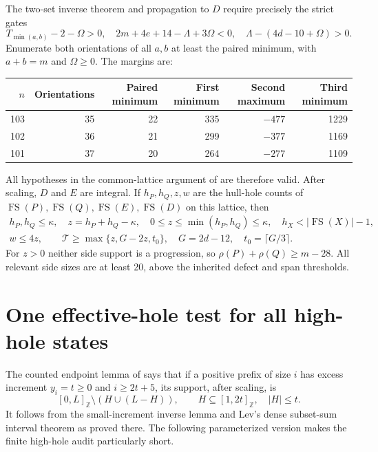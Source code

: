 \documentclass[11pt,a4paper]{article}
\newcommand{\FS}{\operatorname{FS}}
\newcommand{\Z}{\mathbb Z}
\newcommand{\T}{\mathcal T}
\begin{document}
The two-set inverse theorem and propagation to $D$ require precisely the
strict gates
\begin{equation}\label{eq:gates}
 T_{\min(a,b)}-2-\Omega>0,\quad
 2m+4e+14-\Lambda+3\Omega<0,\quad
 \Lambda-(4d-10+\Omega)>0.
\end{equation}
Enumerate both orientations of all $a,b$ at least the paired minimum,
with $a+b=m$ and $\Omega\ge0$. The margins are:
\begin{center}
\begin{tabular}{rrrrrr}
\toprule
$n$&Orientations&Paired minimum&First minimum&Second maximum&Third minimum\\
\midrule
103&35&22&335&$-477$&1229\\
102&36&21&299&$-377$&1169\\
101&37&20&264&$-277$&1109\\
\bottomrule
\end{tabular}
\end{center}
All hypotheses in the common-lattice argument of \cite{previous} are
therefore valid. After scaling, $D$ and $E$ are integral. If $h_P,h_Q,z,w$
are the hull-hole counts of $\FS(P),\FS(Q),\FS(E),\FS(D)$ on this lattice,
then
\begin{gather}
 h_P,h_Q\le\kappa,\quad z=h_P+h_Q-\kappa,
 \quad0\le z\le\min(h_P,h_Q)\le\kappa,\quad
 h_X<|\FS(X)|-1,\label{eq:holes}\\
 w\le4z,\qquad
 \T\ge\max\{z,G-2z,t_0\},\quad
 G=2d-12,\quad t_0=\lceil G/3\rceil.\label{eq:T}
\end{gather}
For $z>0$ neither side support is a progression, so
$\rho(P)+\rho(Q)\ge m-28$. All relevant side sizes are at least 20,
above the inherited defect and span thresholds.

\section{One effective-hole test for all high-hole states}
The counted endpoint lemma of \cite{previous} says that if a positive
prefix of size $i$ has excess increment $y_i=t\ge0$ and $i\ge2t+5$,
its support, after scaling, is
\[
 [0,L]_{\Z}\setminus(H\cup(L-H)),\qquad
 H\subseteq[1,2t]_{\Z},\quad |H|\le t.
\]
It follows from the small-increment inverse lemma and Lev's dense
subset-sum interval theorem as proved there. The following parameterized
version makes the finite high-hole audit particularly short.
\end{document}
